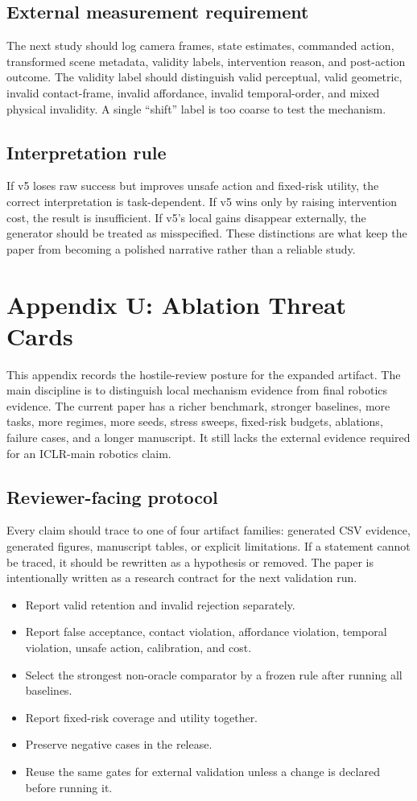 \documentclass{article}
\begin{document}
\subsection{External measurement requirement}
The next study should log camera frames, state estimates, commanded action, transformed scene metadata, validity labels, intervention reason, and post-action outcome. The validity label should distinguish valid perceptual, valid geometric, invalid contact-frame, invalid affordance, invalid temporal-order, and mixed physical invalidity. A single ``shift'' label is too coarse to test the mechanism.

\subsection{Interpretation rule}
If v5 loses raw success but improves unsafe action and fixed-risk utility, the correct interpretation is task-dependent. If v5 wins only by raising intervention cost, the result is insufficient. If v5's local gains disappear externally, the generator should be treated as misspecified. These distinctions are what keep the paper from becoming a polished narrative rather than a reliable study.


\section{Appendix U: Ablation Threat Cards}
This appendix records the hostile-review posture for the expanded artifact. The main discipline is to distinguish local mechanism evidence from final robotics evidence. The current paper has a richer benchmark, stronger baselines, more tasks, more regimes, more seeds, stress sweeps, fixed-risk budgets, ablations, failure cases, and a longer manuscript. It still lacks the external evidence required for an ICLR-main robotics claim.

\subsection{Reviewer-facing protocol}
Every claim should trace to one of four artifact families: generated CSV evidence, generated figures, manuscript tables, or explicit limitations. If a statement cannot be traced, it should be rewritten as a hypothesis or removed. The paper is intentionally written as a research contract for the next validation run.

\begin{itemize}
\item Report valid retention and invalid rejection separately.
\item Report false acceptance, contact violation, affordance violation, temporal violation, unsafe action, calibration, and cost.
\item Select the strongest non-oracle comparator by a frozen rule after running all baselines.
\item Report fixed-risk coverage and utility together.
\item Preserve negative cases in the release.
\item Reuse the same gates for external validation unless a change is declared before running it.
\end{itemize}
\end{document}
